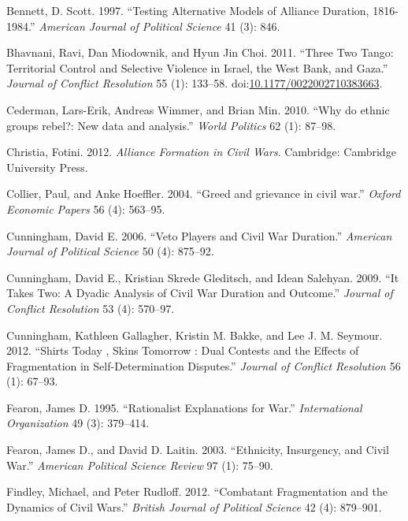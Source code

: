 \documentclass[12pt,]{article}
\begin{document}
\hypertarget{ref-Bennett1997}{}
Bennett, D. Scott. 1997. ``Testing Alternative Models of Alliance
Duration, 1816-1984.'' \emph{American Journal of Political Science} 41
(3): 846.

\hypertarget{ref-Bhavnani2011}{}
Bhavnani, Ravi, Dan Miodownik, and Hyun Jin Choi. 2011. ``Three Two
Tango: Territorial Control and Selective Violence in Israel, the West
Bank, and Gaza.'' \emph{Journal of Conflict Resolution} 55 (1): 133--58.
doi:\href{https://doi.org/10.1177/0022002710383663}{10.1177/0022002710383663}.

\hypertarget{ref-Cederman2010}{}
Cederman, Lars-Erik, Andreas Wimmer, and Brian Min. 2010. ``Why do
ethnic groups rebel?: New data and analysis.'' \emph{World Politics} 62
(1): 87--98.

\hypertarget{ref-Christia2012}{}
Christia, Fotini. 2012. \emph{Alliance Formation in Civil Wars}.
Cambridge: Cambridge University Press.

\hypertarget{ref-Collier2004}{}
Collier, Paul, and Anke Hoeffler. 2004. ``Greed and grievance in civil
war.'' \emph{Oxford Economic Papers} 56 (4): 563--95.

\hypertarget{ref-Cunningham2006}{}
Cunningham, David E. 2006. ``Veto Players and Civil War Duration.''
\emph{American Journal of Political Science} 50 (4): 875--92.

\hypertarget{ref-Cunningham2009}{}
Cunningham, David E., Kristian Skrede Gleditsch, and Idean Salehyan.
2009. ``It Takes Two: A Dyadic Analysis of Civil War Duration and
Outcome.'' \emph{Journal of Conflict Resolution} 53 (4): 570--97.

\hypertarget{ref-Cunningham2012a}{}
Cunningham, Kathleen Gallagher, Kristin M. Bakke, and Lee J. M. Seymour.
2012. ``Shirts Today , Skins Tomorrow : Dual Contests and the Effects of
Fragmentation in Self-Determination Disputes.'' \emph{Journal of
Conflict Resolution} 56 (1): 67--93.

\hypertarget{ref-fearon95}{}
Fearon, James D. 1995. ``Rationalist Explanations for War.''
\emph{International Organization} 49 (3): 379--414.

\hypertarget{ref-fearonlaitin03}{}
Fearon, James D., and David D. Laitin. 2003. ``Ethnicity, Insurgency,
and Civil War.'' \emph{American Political Science Review} 97 (1):
75--90.

\hypertarget{ref-Findley2012}{}
Findley, Michael, and Peter Rudloff. 2012. ``Combatant Fragmentation and
the Dynamics of Civil Wars.'' \emph{British Journal of Political
Science} 42 (4): 879--901.
\end{document}
